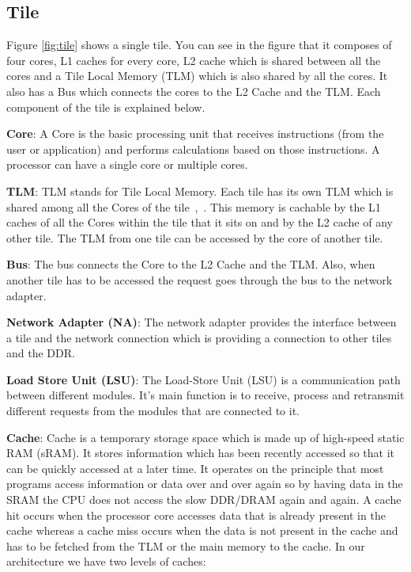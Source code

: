 \documentclass{listhesis}
\begin{document}
\subsection{Tile}
Figure \ref{fig:tile} shows a single tile. You can see in the figure that it composes of four cores, L1 caches for every core, L2 cache which is shared between all the cores and a Tile Local Memory (TLM) which is also shared by all the cores. It also has a Bus which connects the cores to the L2 Cache and the TLM. Each component of the tile is explained below.
\par
\textbf{Core}: A Core is the basic processing unit that receives instructions (from the user or application) and performs calculations based on those instructions. A processor can have a single core or multiple cores.  
\par
\textbf{TLM}: TLM stands for Tile Local Memory. Each tile has its own TLM which is shared among all the Cores of the tile~\cite{ankitThesis},~\cite{iNetworkAdapter}. This memory is cachable by the L1 caches of all the Cores within the tile that it sits on and by the L2 cache of any other tile. The TLM from one tile can be accessed by the core of another tile.
\par
\textbf{Bus}: The bus connects the Core to the L2 Cache and the TLM. Also, when another tile has to be accessed the request goes through the bus to the network adapter.
\par
\textbf{Network Adapter (NA)}: The network adapter provides the interface between a tile and the network connection which is providing a connection to other tiles and the DDR.
\par
\textbf{Load Store Unit (LSU)}: The Load-Store Unit (LSU) is a communication path between different modules. It's main function is to receive, process and retransmit different requests from the modules that are connected to it.
\par
\textbf{Cache}: Cache is a temporary storage space which is made up of high-speed static RAM (sRAM). It stores information which has been recently accessed so that it can be quickly accessed at a later time. It operates on the principle that most programs access information or data over and over again so by having data in the SRAM the CPU does not access the slow DDR/DRAM again and again. A cache hit occurs when the processor core accesses data that is already present in the cache whereas a cache miss occurs when the data is not present in the cache and has to be fetched from the TLM or the main memory to the cache. In our architecture we have two levels of caches:
\end{document}
